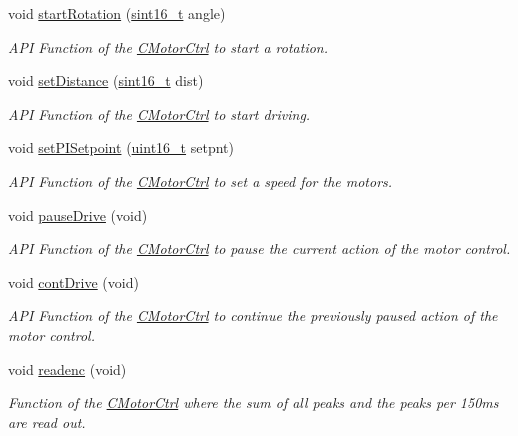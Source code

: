 \begin{DoxyCompactItemize}
void \mbox{\hyperlink{class_c_motor_ctrl_a1ee991f9511437a2e64ee75161063020}{start\+Rotation}} (\mbox{\hyperlink{_a_d_a_s___types_8h_ae4c9b951dbb7355563c313abca5e2e75}{sint16\+\_\+t}} angle)
\begin{DoxyCompactList}\small\item\em A\+PI Function of the \mbox{\hyperlink{class_c_motor_ctrl}{C\+Motor\+Ctrl}} to start a rotation. \end{DoxyCompactList}\item 
void \mbox{\hyperlink{class_c_motor_ctrl_a0ae095bb6003ee63086361661f32ad3a}{set\+Distance}} (\mbox{\hyperlink{_a_d_a_s___types_8h_ae4c9b951dbb7355563c313abca5e2e75}{sint16\+\_\+t}} dist)
\begin{DoxyCompactList}\small\item\em A\+PI Function of the \mbox{\hyperlink{class_c_motor_ctrl}{C\+Motor\+Ctrl}} to start driving. \end{DoxyCompactList}\item 
void \mbox{\hyperlink{class_c_motor_ctrl_a5c6d49d9b407e46aad0abe84bcaf16ec}{set\+P\+I\+Setpoint}} (\mbox{\hyperlink{_a_d_a_s___types_8h_a1f1825b69244eb3ad2c7165ddc99c956}{uint16\+\_\+t}} setpnt)
\begin{DoxyCompactList}\small\item\em A\+PI Function of the \mbox{\hyperlink{class_c_motor_ctrl}{C\+Motor\+Ctrl}} to set a speed for the motors. \end{DoxyCompactList}\item 
void \mbox{\hyperlink{class_c_motor_ctrl_af3e047be659fb9f49f1644ba2eca4684}{pause\+Drive}} (void)
\begin{DoxyCompactList}\small\item\em A\+PI Function of the \mbox{\hyperlink{class_c_motor_ctrl}{C\+Motor\+Ctrl}} to pause the current action of the motor control. \end{DoxyCompactList}\item 
void \mbox{\hyperlink{class_c_motor_ctrl_a6b67180c355c2acf76d641f2817db66d}{cont\+Drive}} (void)
\begin{DoxyCompactList}\small\item\em A\+PI Function of the \mbox{\hyperlink{class_c_motor_ctrl}{C\+Motor\+Ctrl}} to continue the previously paused action of the motor control. \end{DoxyCompactList}\item 
void \mbox{\hyperlink{class_c_motor_ctrl_a8a76501cf8eaa85c5131bde5f33b6699}{readenc}} (void)
\begin{DoxyCompactList}\small\item\em Function of the \mbox{\hyperlink{class_c_motor_ctrl}{C\+Motor\+Ctrl}} where the sum of all peaks and the peaks per 150ms are read out. \end{DoxyCompactList}\end{DoxyCompactItemize}


